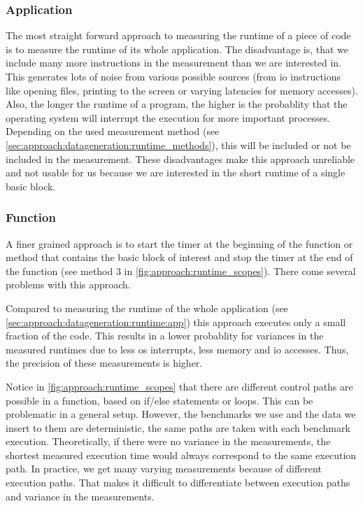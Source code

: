 \subsubsection{Application}
\tobechecked
\label{sec:approach:datageneration:runtime:app}
The most straight forward approach to measuring the runtime of a piece of code is to measure the runtime of its whole application.
The disadvantage is, that we include many more instructions in the measurement than we are interested in.
This generates lots of noise from various possible sources (\eg from \ac{io} instructions like opening files, printing to the screen or varying latencies for memory accesses).
Also, the longer the runtime of a program, the higher is the probablity that the operating system will interrupt the execution for more important processes.
Depending on the used measurement method (see \cref{sec:approach:datageneration:runtime_methods}), this will be included or not be included in the measurement.
These disadvantages make this approach unreliable and not usable for us because we are interested in the short runtime of a single basic block.

\subsubsection{Function}
\tobechecked
\label{sec:approach:datageneration:runtime:function}
A finer grained approach is to start the timer at the beginning of the function or method that contains the basic block of interest and stop the timer at the end of the function (see method 3 in \cref{fig:approach:runtime_scopes}).
There come several problems with this approach.

Compared to measuring the runtime of the whole application (see \cref{sec:approach:datageneration:runtime:app}) this approach executes only a small fraction of the code.
This results in a lower probablity for variances in the measured runtimes due to less \ac{os} interrupts, less memory and \ac{io} accesses.
Thus, the precision of these measurements is higher.

Notice in \cref{fig:approach:runtime_scopes} that there are different control paths are possible in a function, based on if/else statements or loops.
This can be problematic in a general setup.
However, the benchmarks we use and the data we insert to them are deterministic, \ie the same paths are taken with each benchmark execution.
Theoretically, if there were no variance in the measurements, the shortest measured execution time would always correspond to the same execution path.
In practice, we get many varying measurements because of different execution paths.
That makes it difficult to differentiate between execution paths and variance in the measurements.

